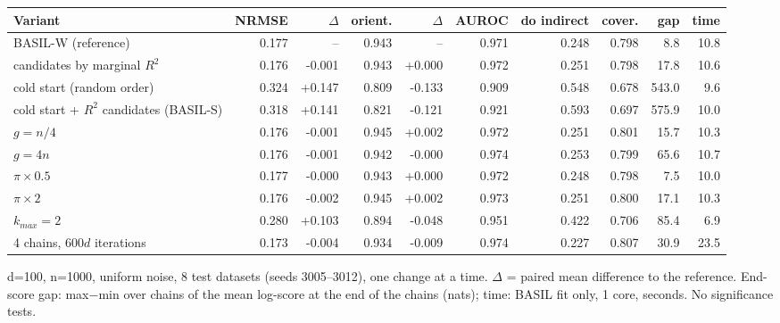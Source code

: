\begin{adjustbox}{max width=\textwidth}
\begin{tabular}{lrrrrrrrrr}
\toprule
Variant & NRMSE & $\Delta$ & orient. & $\Delta$ & AUROC & do indirect & cover. & gap & time \\
\midrule
BASIL-W (reference) & 0.177 & -- & 0.943 & -- & 0.971 & 0.248 & 0.798 & 8.8 & 10.8 \\
candidates by marginal $R^2$ & 0.176 & -0.001 & 0.943 & +0.000 & 0.972 & 0.251 & 0.798 & 17.8 & 10.6 \\
cold start (random order) & 0.324 & +0.147 & 0.809 & -0.133 & 0.909 & 0.548 & 0.678 & 543.0 & 9.6 \\
cold start + $R^2$ candidates (BASIL-S) & 0.318 & +0.141 & 0.821 & -0.121 & 0.921 & 0.593 & 0.697 & 575.9 & 10.0 \\
$g=n/4$ & 0.176 & -0.001 & 0.945 & +0.002 & 0.972 & 0.251 & 0.801 & 15.7 & 10.3 \\
$g=4n$ & 0.176 & -0.001 & 0.942 & -0.000 & 0.974 & 0.253 & 0.799 & 65.6 & 10.7 \\
$\pi \times 0.5$ & 0.177 & -0.000 & 0.943 & +0.000 & 0.972 & 0.248 & 0.798 & 7.5 & 10.0 \\
$\pi \times 2$ & 0.176 & -0.002 & 0.945 & +0.002 & 0.973 & 0.251 & 0.800 & 17.1 & 10.3 \\
$k_{max}=2$ & 0.280 & +0.103 & 0.894 & -0.048 & 0.951 & 0.422 & 0.706 & 85.4 & 6.9 \\
4 chains, $600d$ iterations & 0.173 & -0.004 & 0.934 & -0.009 & 0.974 & 0.227 & 0.807 & 30.9 & 23.5 \\
\bottomrule
\end{tabular}
\end{adjustbox}

\smallskip
{\footnotesize d=100, n=1000, uniform noise, 8 test datasets (seeds 3005--3012), one change at a time. $\Delta$ = paired mean difference to the reference. End-score gap: max$-$min over chains of the mean log-score at the end of the chains (nats); time: BASIL fit only, 1 core, seconds. No significance tests.}
